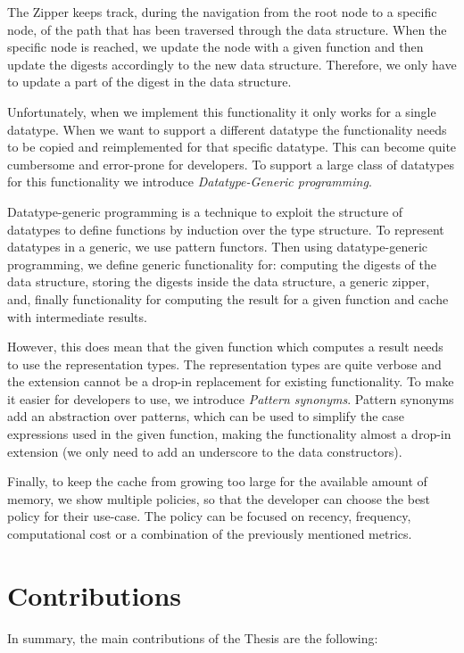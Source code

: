 The Zipper keeps track, during the navigation from the root node to a specific node, of the path that has been traversed through the data structure. When the specific node is reached, we update the node with a given function and then update the digests accordingly to the new data structure. Therefore, we only have to update a part of the digest in the data structure.

Unfortunately, when we implement this functionality it only works for a single datatype. When we want to support a different datatype the functionality needs to be copied and reimplemented for that specific datatype. This can become quite cumbersome and error-prone for developers. To support a large class of datatypes for this functionality we introduce \textit{Datatype-Generic programming}.

Datatype-generic programming is a technique to exploit the structure of datatypes to define functions by induction over the type structure. To represent datatypes in a generic, we use pattern functors. Then using datatype-generic programming, we define generic functionality for: computing the digests of the data structure, storing the digests inside the data structure, a generic zipper, and, finally functionality for computing the result for a given function and cache with intermediate results. 

However, this does mean that the given function which computes a result needs to use the representation types. The representation types are quite verbose and the extension cannot be a drop-in replacement for existing functionality. To make it easier for developers to use, we introduce \textit{Pattern synonyms}\cite*{pickering2016pattern}. Pattern synonyms add an abstraction over patterns, which can be used to simplify the case expressions used in the given function, making the functionality almost a drop-in extension (we only need to add an underscore to the data constructors). 

Finally, to keep the cache from growing too large for the available amount of memory, we show multiple policies, so that the developer can choose the best policy for their use-case. The policy can be focused on recency, frequency, computational cost or a combination of the previously mentioned metrics.

\section{Contributions}

In summary, the main contributions of the Thesis are the following:

